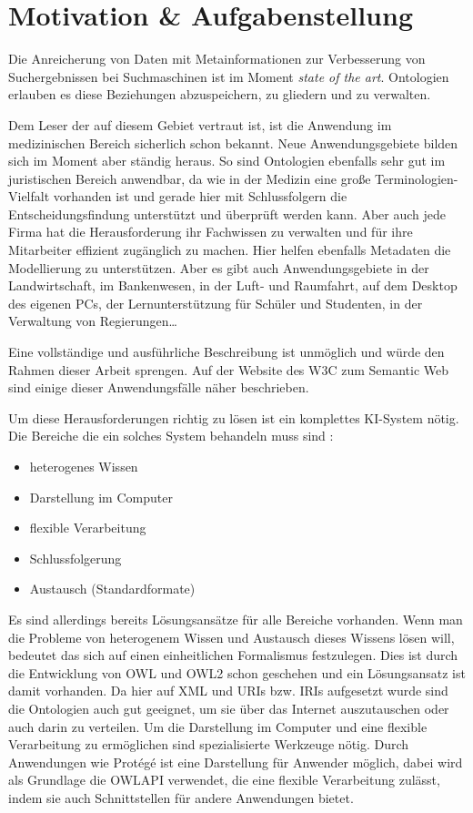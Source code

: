 \chapter{Motivation \& Aufgabenstellung}
\label{kapitel-motivation}

Die Anreicherung von Daten mit Metainformationen zur Verbesserung von Suchergebnissen bei Suchmaschinen ist im Moment \emph{state of the art}. Ontologien erlauben es diese Beziehungen abzuspeichern, zu gliedern und zu verwalten.

Dem Leser der auf diesem Gebiet vertraut ist, ist die Anwendung im medizinischen Bereich sicherlich schon bekannt. Neue Anwendungsgebiete bilden sich im Moment aber ständig heraus. So sind Ontologien ebenfalls sehr gut im juristischen Bereich anwendbar, da wie in der Medizin eine große Terminologien-Vielfalt vorhanden ist und gerade hier mit Schlussfolgern die Entscheidungsfindung unterstützt und überprüft werden kann.
Aber auch jede Firma hat die Herausforderung ihr Fachwissen zu verwalten und für ihre Mitarbeiter effizient zugänglich zu machen. Hier helfen ebenfalls Metadaten die Modellierung zu unterstützen.
Aber es gibt auch Anwendungsgebiete in der Landwirtschaft, im Bankenwesen, in der Luft- und Raumfahrt, auf dem Desktop des eigenen PCs, der Lernunterstützung für Schüler und Studenten, in der Verwaltung von Regierungen\ldots

Eine vollständige und ausführliche Beschreibung ist unmöglich und würde den Rahmen dieser Arbeit sprengen. Auf der Website des W3C zum Semantic Web \cite{W3CUseCases} sind einige dieser Anwendungsfälle näher beschrieben.

Um diese Herausforderungen richtig zu lösen ist ein komplettes KI-System nötig. Die Bereiche die ein solches System behandeln muss sind \cite{vonHenke2009}:

\begin{itemize}
  \item heterogenes Wissen
  \item Darstellung im Computer
  \item flexible Verarbeitung
  \item Schlussfolgerung
  \item Austausch (Standardformate)
\end{itemize}

Es sind allerdings bereits Lösungsansätze für alle Bereiche vorhanden. Wenn man die Probleme von heterogenem Wissen und Austausch dieses Wissens lösen will, bedeutet das sich auf einen einheitlichen Formalismus festzulegen. Dies ist durch die Entwicklung von OWL und OWL2 schon geschehen und ein Lösungsansatz ist damit vorhanden. Da hier auf XML und URIs bzw. IRIs aufgesetzt wurde sind die Ontologien auch gut geeignet, um sie über das Internet auszutauschen oder auch darin zu verteilen. Um die Darstellung im Computer und eine flexible Verarbeitung zu ermöglichen sind spezialisierte Werkzeuge nötig. Durch Anwendungen wie Protégé ist eine Darstellung für Anwender möglich, dabei wird als Grundlage die OWLAPI verwendet, die eine flexible Verarbeitung zulässt, indem sie auch Schnittstellen für andere Anwendungen bietet.

